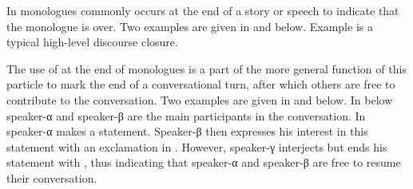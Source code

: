In monologues  commonly occurs at the end
of a story or speech to indicate that the monologue is over.
Two examples are given in  and  below.
Example  is a typical high-level discourse closure.

\begin{exe}
		\label{ex:130825-3, 2.35}
	\label{ex:120715-2, 1.31}
\end{exe}

The use of  at the end of monologues
is a part of the more general function of this
particle to mark the end of a conversational turn,
after which others are free to contribute to the conversation.
Two examples are given in 
and  below.
In  below speaker-α and speaker-β
are the main participants in the conversation.
In  speaker-α makes a statement.
Speaker-β then expresses his interest in this statement with an exclamation in .
However, speaker-γ interjects but ends his statement with ,
thus indicating that speaker-α and speaker-β are free to resume their conversation.

